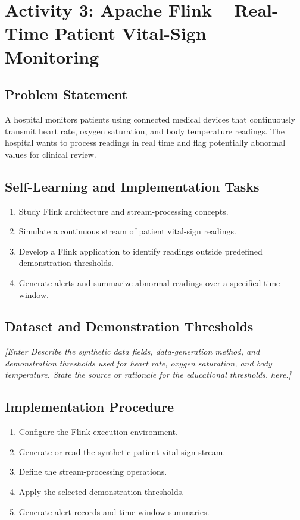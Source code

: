 \documentclass[12pt,a4paper]{report}
\newcommand{\placeholder}[1]{\textit{[Enter #1 here.]}}
\newcommand{\activityheading}[2]{%
  \section{Activity #1: #2}%
}
\begin{document}
\clearpage
\activityheading{3}{Apache Flink -- Real-Time Patient Vital-Sign Monitoring}

\subsection{Problem Statement}
A hospital monitors patients using connected medical devices that
continuously transmit heart rate, oxygen saturation, and body temperature
readings. The hospital wants to process readings in real time and flag
potentially abnormal values for clinical review.

\subsection{Self-Learning and Implementation Tasks}
\begin{enumerate}
    \item Study Flink architecture and stream-processing concepts.
    \item Simulate a continuous stream of patient vital-sign readings.
    \item Develop a Flink application to identify readings outside predefined
    demonstration thresholds.
    \item Generate alerts and summarize abnormal readings over a specified
    time window.
\end{enumerate}

\subsection{Dataset and Demonstration Thresholds}
\placeholder{Describe the synthetic data fields, data-generation method,
and demonstration thresholds used for heart rate, oxygen saturation,
and body temperature. State the source or rationale for the educational
thresholds.}

\subsection{Implementation Procedure}
\begin{enumerate}
    \item Configure the Flink execution environment.
    \item Generate or read the synthetic patient vital-sign stream.
    \item Define the stream-processing operations.
    \item Apply the selected demonstration thresholds.
    \item Generate alert records and time-window summaries.
\end{enumerate}
\end{document}
